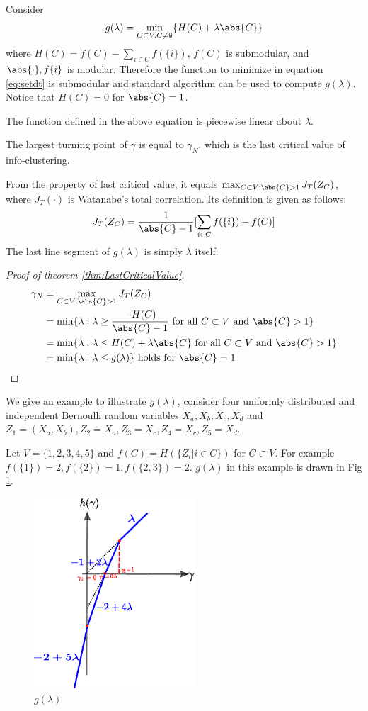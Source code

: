 Consider
\begin{equation}\label{eq:setdt}
g(\lambda) = \min_{C\subset V, C\neq \emptyset} \{ H(C) + \lambda\abs{C}\}
\end{equation}
where $H(C) = f(C) - \sum_{i\in C} f(\{i\})$, $f(C)$ is submodular, and $\abs{\cdot}, f\{i\}$ is modular.
Therefore the function to minimize in equation \eqref{eq:setdt} is submodular and standard algorithm can be
used to compute $g(\lambda)$.
Notice that $H(C)=0$ for $\abs{C}=1$.

The function defined in the above equation is piecewise linear about $\lambda$.
\begin{theorem}\label{thm:LastCriticalValue}
The largest turning point of $\gamma$ is equal to $\gamma_N$, which is the last critical value of info-clustering.
\end{theorem}
From the property of last critical value, it equals $\max_{C\subset V: \abs{C}>1}J_T(Z_C)$,
where $J_T(\cdot)$ is Watanabe's total correlation. Its definition is given as follows:
\begin{equation}
J_T(Z_C) = \frac{1}{\abs{C}-1} [\sum_{i\in C} f(\{i\}) - f(C)]
\end{equation}
The last line segment of $g(\lambda)$ is simply $\lambda$ itself.
\begin{proof}[Proof of theorem \ref{thm:LastCriticalValue}]
\begin{align*}
\gamma_N & = \max_{C\subset V: \abs{C}>1} J_T(Z_C) \\
& = \min\{\lambda : \lambda \geq \frac{-H(C)}{\abs{C}-1} \textrm{ for all $C\subset V$ and $\abs{C}>1$}\} \\
& = \min\{\lambda : \lambda \leq H(C)+\lambda\abs{C} \textrm{ for all $C\subset V$ and $\abs{C}>1$}\} \\
& = \min\{\lambda : \lambda \leq g(\lambda) \} \textrm{ holds for } \abs{C}=1
\end{align*}
\end{proof}

We give an example to illustrate $g(\lambda)$, consider four
uniformly distributed and independent Bernoulli random variables $X_a, X_b, X_c, X_d$ and $
Z_1 = (X_a, X_b), Z_2 = X_a, Z_3 = X_c, Z_4 = X_c, Z_5 = X_d$.

Let $V=\{1,2,3,4,5\}$ and $f(C) = H(\{Z_i |  i \in C \})$ for $C\subset V$.
For example $f(\{1\}) = 2, f(\{2\})=1, f(\{2,3\})=2$.
$g(\lambda)$ in this example is drawn in Fig \ref{fig:gLambda}.
\begin{figure}[!ht]
\includegraphics[width=6cm]{pic/dt2.eps}
\caption{$g(\lambda)$}\label{fig:gLambda}
\end{figure}
